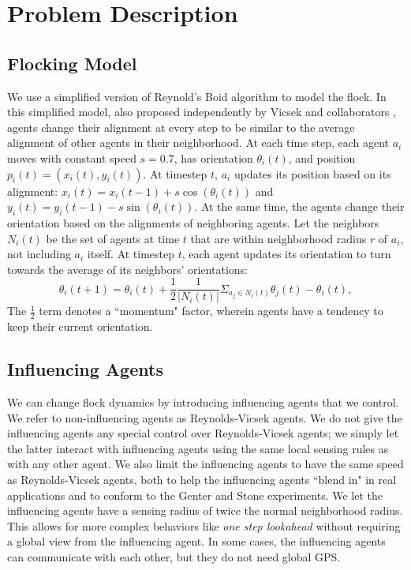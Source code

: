 
\chapter{Problem Description}
\label{ch:problem}

\section{Flocking Model}
We use a simplified version of Reynold's Boid algorithm \cite{reynoldsmodel}
to model the flock.
In this simplified model, also proposed independently by Vicsek and
collaborators \cite{vicsek1995},
agents change their alignment at every step to be similar to the average
alignment of other agents in their neighborhood.
At each time step, each agent $a_i$ moves with constant speed $s=0.7$, has
orientation $\theta_i(t)$, and position $p_i(t) = (x_i(t), y_i(t))$.
At timestep $t$, $a_i$ updates its position based on its alignment:
$x_i(t) = x_i(t-1) + s\cos(\theta_i(t))$ and
$y_i(t) = y_i (t-1) - s\sin(\theta_i(t))$.
At the same time, the agents change their orientation based on the alignments
of neighboring agents.
Let the neighbors $N_i(t)$ be the set of agents at time $t$ that are within
neighborhood radius $r$ of $a_i$, not including $a_i$ itself.
At timestep $t$, each agent updates its orientation to turn towards the average
of its neighbors' orientations:
\[\theta_i(t+1)=\theta_i(t)+\frac{1}{2}\frac{1}{|N_i(t)|} \Sigma_{a_j \in
N_i(t)} \theta_j(t) - \theta_i(t),\]
The $\frac{1}{2}$ term denotes a ``momentum" factor, wherein agents have
a tendency to keep their current orientation.

\section{Influencing Agents}
We can change flock dynamics by introducing influencing agents that we control.
We refer to non-influencing agents as Reynolds-Vicsek agents.
We do not give the influencing agents any special control over Reynolds-Vicsek
agents; we simply let the latter interact with influencing agents using the
same local sensing rules as with any other agent.
We also limit the influencing agents to have the same speed as Reynolds-Vicsek
agents, both to help the influencing agents ``blend in" in real applications
and to conform to the Genter and Stone experiments.
We let the influencing agents have a sensing radius of twice the normal
neighborhood radius.
This allows for more complex behaviors like \textit{one step lookahead}
without requiring a global view from the influencing agent.
In some cases, the influencing agents can communicate with each other, but
they do not need global GPS.


